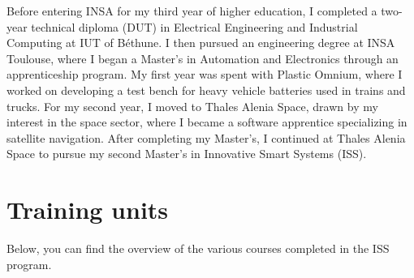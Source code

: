 Before entering INSA for my third year of higher education, I completed a two-year technical diploma (DUT) in Electrical Engineering and Industrial Computing at IUT of Béthune. 
I then pursued an engineering degree at INSA Toulouse, where I began a Master’s in Automation and Electronics through an apprenticeship program. 
My first year was spent with Plastic Omnium, where I worked on developing a test bench for heavy vehicle batteries used in trains and trucks. 
For my second year, I moved to Thales Alenia Space, drawn by my interest in the space sector, where I became a software apprentice specializing in satellite navigation.
After completing my Master’s, I continued at Thales Alenia Space to pursue my second Master’s in Innovative Smart Systems (ISS).



\section{Training units}

Below, you can find the overview of the various courses completed in the ISS program.


